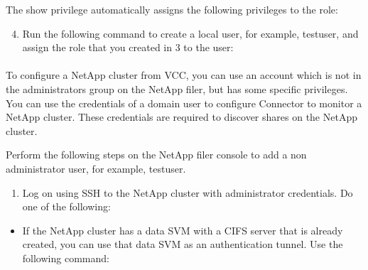 \documentclass[letterpaper,10pt,english]{sphinxmanual}
\begin{document}


The  show privilege automatically assigns the following privileges to the role:



\begin{enumerate}
\setcounter{enumi}{3}
\item {} 
Run the following command to create a local user, for example, testuser, and assign the role that you created in 3 to the user:

\end{enumerate}




\paragraph{}
\label{\detokenize{mcdmp_app_ug:preparing-a-non-administrator-domain-user-on-a-netapp-cluster}}
To configure a NetApp cluster from VCC, you can use an account which is not in the administrators group on the NetApp filer, but has some specific privileges. You can use the credentials of a domain user to configure Connector to monitor a NetApp cluster. These credentials are required to discover shares on the NetApp cluster.

Perform the following steps on the NetApp filer console to add a non administrator user, for example, testuser.

\begin{enumerate}
\item {} 
Log on using SSH to the NetApp cluster with administrator credentials. Do one of the following:

\end{enumerate}
\begin{itemize}
\item {} 
If the NetApp cluster has a data SVM with a CIFS server that is already created, you can use that data SVM as an authentication tunnel. Use the following command:

\end{itemize}
\end{document}
